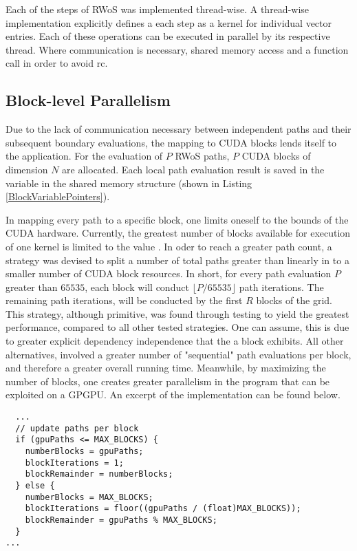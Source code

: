 Each of the steps of \Gls{RWoS} was implemented thread-wise.  A thread-wise implementation
explicitly defines a each step as a kernel for individual vector entries.  Each of these operations
can be executed in parallel by its respective thread.  Where communication is necessary,
shared memory access and a function call  in order to avoid \Gls{rc}.

\subsection{Block-level Parallelism}
Due to the lack of communication necessary between independent paths and
their subsequent boundary evaluations, the mapping to \Gls{CUDA} blocks lends itself
to the  application.  For the evaluation of $P$ \Gls{RWoS} paths, $P$ CUDA blocks
of dimension $N$ are allocated.  Each local path evaluation result is saved in the 
variable in the shared memory structure (shown in Listing \ref{BlockVariablePointers}).
\par
In mapping every path to a specific block, one limits oneself to the bounds of the
CUDA hardware.  Currently, the greatest number of blocks available for execution
of one kernel is limited to the value .  In oder to reach a greater
path count, a strategy was devised to split a number of total paths greater
than  linearly in to a smaller number of \Gls{CUDA} block resources.  In short,
for every path evaluation $P$ greater than $65535$, each block will conduct $\lfloor P/65535 \rfloor$
path iterations. The remaining path iterations,  will be conducted
 by the first $R$ blocks of the grid.  This strategy,
although primitive, was found through testing to yield the greatest performance,
compared to all other tested strategies. One can assume, this is due to greater
explicit dependency independence that the a block exhibits.  All other alternatives,
involved a greater number of "sequential" path evaluations per block, and therefore
a greater overall running time.   Meanwhile, by maximizing the number of blocks,
one creates greater parallelism in the program that can be exploited on a \Gls{GPGPU}.
An excerpt of the implementation can be found below.
\begin{listing}
\label{block-parallelism-strategy}
\begin{verbatim}
  ...
  // update paths per block
  if (gpuPaths <= MAX_BLOCKS) {
    numberBlocks = gpuPaths;
    blockIterations = 1;
    blockRemainder = numberBlocks;
  } else {
    numberBlocks = MAX_BLOCKS;
    blockIterations = floor((gpuPaths / (float)MAX_BLOCKS));
    blockRemainder = gpuPaths % MAX_BLOCKS;
  }
...
\end{verbatim}
\end{listing}

